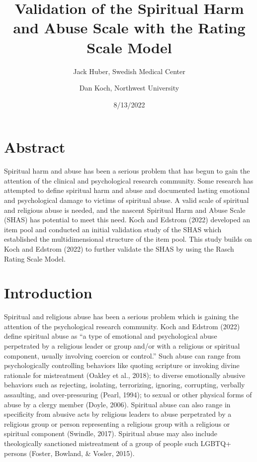 \documentclass[
  letterpaper,
]{article}
\title{Validation of the Spiritual Harm and Abuse Scale with the Rating
Scale Model}
\author{Jack Huber, Swedish Medical Center \and Dan Koch, Northwest
University}
\date{8/13/2022}
\renewcommand*\contentsname{Table of contents}
\newcommand\contentsname{Table of contents}
\begin{document}
\maketitle
\ifdefined\Shaded\renewenvironment{Shaded}{\begin{tcolorbox}[breakable, boxrule=0pt, sharp corners, enhanced, frame hidden, interior hidden, borderline west={3pt}{0pt}{shadecolor}]}{\end{tcolorbox}}\fi

\renewcommand*\contentsname{Table of contents}
{
\hypersetup{linkcolor=}
\setcounter{tocdepth}{2}
\tableofcontents
}

\hypertarget{abstract}{%
\chapter*{Abstract}\label{abstract}}

Spiritual harm and abuse has been a serious problem that has begun to
gain the attention of the clinical and psychological research community.
Some research has attempted to define spiritual harm and abuse and
documented lasting emotional and psychological damage to victims of
spiritual abuse. A valid scale of spiritual and religious abuse is
needed, and the nascent Spiritual Harm and Abuse Scale (SHAS) has
potential to meet this need. Koch and Edstrom (2022) developed an item
pool and conducted an initial validation study of the SHAS which
established the multidimensional structure of the item pool. This study
builds on Koch and Edstrom (2022) to further validate the SHAS by using
the Rasch Rating Scale Model.


\hypertarget{introduction}{%
\chapter*{Introduction}\label{introduction}}

Spiritual and religious abuse has been a serious problem which is
gaining the attention of the psychological research community. Koch and
Edstrom (2022) define spiritual abuse as ``a type of emotional and
psychological abuse perpetrated by a religious leader or group and/or
with a religious or spiritual component, usually involving coercion or
control.'' Such abuse can range from psychologically controlling
behaviors like quoting scripture or invoking divine rationale for
mistreatment (Oakley et al., 2018); to diverse emotionally abusive
behaviors such as rejecting, isolating, terrorizing, ignoring,
corrupting, verbally assaulting, and over-pressuring (Pearl, 1994); to
sexual or other physical forms of abuse by a clergy member (Doyle,
2006). Spiritual abuse can also range in specificity from abusive acts
by religious leaders to abuse perpetrated by a religious group or person
representing a religious group with a religious or spiritual component
(Swindle, 2017). Spiritual abuse may also include theologically
sanctioned mistreatment of a group of people such LGBTQ+ persons
(Foster, Bowland, \& Vosler, 2015).
\end{document}
